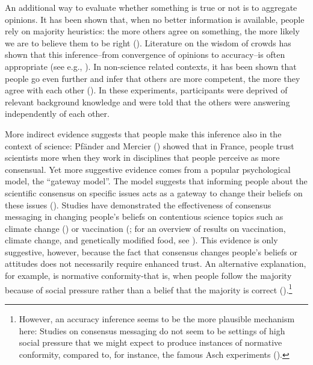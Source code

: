 \documentclass[
  jou,
  floatsintext,
  longtable,
  nolmodern,
  notxfonts,
  notimes,
  colorlinks=true,linkcolor=blue,citecolor=blue,urlcolor=blue]{apa7}
\begin{document}
An additional way to evaluate whether something is true or not is to
aggregate opinions. It has been shown that, when no better information
is available, people rely on majority heuristics: the more others agree
on something, the more likely we are to believe them to be right
().
Literature on the wisdom of crowds has shown that this inference--from
convergence of opinions to accuracy--is often appropriate (see e.g.,
).
In non-science related contexts, it has been shown that people go even
further and infer that others are more competent, the more they agree
with each other (). In these experiments, participants were
deprived of relevant background knowledge and were told that the others
were answering independently of each other.

More indirect evidence suggests that people make this inference also in
the context of science: Pfänder and Mercier
() showed that in France,
people trust scientists more when they work in disciplines that people
perceive as more consensual. Yet more suggestive evidence comes from a
popular psychological model, the ``gateway model''. The model suggests
that informing people about the scientific consensus on specific issues
acts as a gateway to change their beliefs on these issues
().
Studies have demonstrated the effectiveness of consensus messaging in
changing people's beliefs on contentious science topics such as climate
change () or vaccination
(;
for an overview of results on vaccination, climate change, and
genetically modified food, see
). This evidence is only suggestive, however,
because the fact that consensus changes people's beliefs or attitudes
does not necessarily require enhanced trust. An alternative explanation,
for example, is normative conformity-that is, when people follow the
majority because of social pressure rather than a belief that the
majority is correct ().\footnote{However, an accuracy inference seems to be
  the more plausible mechanism here: Studies on consensus messaging do
  not seem to be settings of high social pressure that we might expect
  to produce instances of normative conformity, compared to, for
  instance, the famous Asch experiments
  ().}
\end{document}
